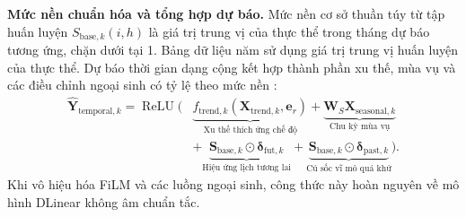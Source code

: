 \documentclass[10pt,journal,compsoc]{IEEEtran}
\begin{document}
\noindent \textbf{Mức nền chuẩn hóa và tổng hợp dự báo.} Mức nền cơ sở thuần túy từ tập huấn luyện $S_{\text{base},k}(i,h)$ là giá trị trung vị của thực thể trong tháng dự báo tương ứng, chặn dưới tại 1. Bảng dữ liệu năm sử dụng giá trị trung vị huấn luyện của thực thể. Dự báo thời gian dạng cộng kết hợp thành phần xu thế, mùa vụ và các điều chỉnh ngoại sinh có tỷ lệ theo mức nền \cite{hastie1990gam}:
\begin{equation}
\begin{aligned}
\hat{\mathbf{Y}}_{\text{temporal}, k} = \operatorname{ReLU}\Big(& \underbrace{f_{\text{trend}, k}(\mathbf{X}_{\text{trend}, k}, \mathbf{e}_r)}_{\text{Xu thế thích ứng chế độ}} + \underbrace{\mathbf{W}_S \mathbf{X}_{\text{seasonal}, k}}_{\text{Chu kỳ mùa vụ}} \\
&+ \underbrace{\mathbf{S}_{\text{base}, k} \odot \boldsymbol{\delta}_{\text{fut}, k}}_{\text{Hiệu ứng lịch tương lai}} + \underbrace{\mathbf{S}_{\text{base}, k} \odot \boldsymbol{\delta}_{\text{past}, k}}_{\text{Cú sốc vĩ mô quá khứ}}\Big).
\end{aligned}
\label{eq:temporal_forecast}
\end{equation}
Khi vô hiệu hóa FiLM và các luồng ngoại sinh, công thức này hoàn nguyên về mô hình DLinear không âm chuẩn tắc.
\end{document}
